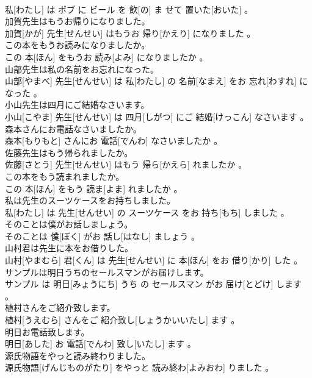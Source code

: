 \documentclass[8pt]{extreport}
\begin{document}
\begin{CJK}{UTF8}{min}
\\	私[わたし] は ボブ に ビール を 飲[の] ま せて 置いた[おいた] 。
\\	加賀先生はもうお帰りになりました。	
\\	加賀[かが] 先生[せんせい] はもうお 帰り[かえり] になりました 。
\\	この本をもうお読みになりましたか。	
\\	この 本[ほん] をもうお 読み[よみ] になりましたか 。
\\	山部先生は私の名前をお忘れになった。	
\\	山部[やまべ] 先生[せんせい] は 私[わたし] の 名前[なまえ] をお 忘れ[わすれ] になった 。
\\	小山先生は四月にご結婚なさいます。	
\\	小山[こやま] 先生[せんせい] は 四月[しがつ] にご 結婚[けっこん] なさいます 。
\\	森本さんにお電話なさいましたか。	
\\	森本[もりもと] さんにお 電話[でんわ] なさいましたか 。
\\	佐藤先生はもう帰られましたか。	
\\	佐藤[さとう] 先生[せんせい] はもう 帰ら[かえら] れましたか 。
\\	この本をもう読まれましたか。	
\\	この 本[ほん] をもう 読ま[よま] れましたか 。
\\	私は先生のスーツケースをお持ちしました。	
\\	私[わたし] は 先生[せんせい] の スーツケース をお 持ち[もち] しました 。
\\	そのことは僕がお話しましょう。	
\\	そのことは 僕[ぼく] がお 話し[はなし] ましょう 。
\\	山村君は先生に本をお借りした。	
\\	山村[やまむら] 君[くん] は 先生[せんせい] に 本[ほん] をお 借り[かり] した 。
\\	サンプルは明日うちのセールスマンがお届けします。	
\\	サンプル は 明日[みょうにち] うち の セールスマン がお 届け[とどけ] します 。
\\	植村さんをご紹介致します。	
\\	植村[うえむら] さんをご 紹介致し[しょうかいいたし] ます 。
\\	明日お電話致します。	
\\	明日[あした] お 電話[でんわ] 致し[いたし] ます 。
\\	源氏物語をやっと読み終わりました。	
\\	源氏物語[げんじものがたり] をやっと 読み終わ[よみおわ] りました 。

\end{CJK}
\end{document}
